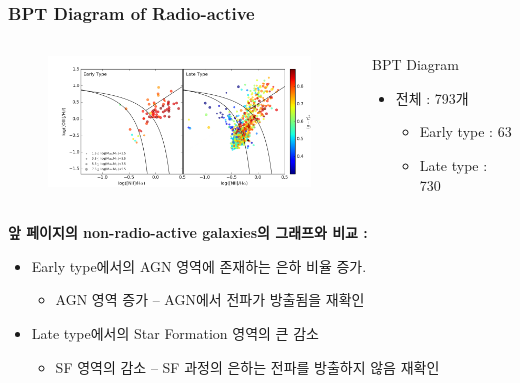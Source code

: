 \documentclass[xcolor={dvipsnames,table}]{beamer}
\newcommand\SM{\fontsize{8}{7.2}\selectfont}
\newcommand\SSM{\fontsize{7}{7.2}\selectfont}
\begin{document}
\begin{frame}
  \frametitle{BPT Diagram of Radio-active}
  \SM
  \begin{columns}
   \begin{figure}
    \centering
    \includegraphics[width=7cm, height=3.5cm]{BPT_radio_Active.png}
   \end{figure}
   \centering
   \begin{block}{BPT Diagram}
    \begin{itemize}
     \item 전체 : 793개
     \begin{itemize}
      \item Early type : 63
      \item Late type : 730
     \end{itemize}
    \end{itemize}
   \end{block}
  \end{columns}
  \vspace{0.2cm}
  \textbf{앞 페이지의 non-radio-active galaxies의 그래프와 비교 :}
  \begin{itemize}
   \item  Early type에서의 AGN 영역에 존재하는 은하 비율 증가.
   \begin{itemize}
   \SSM
   [triangle]
    \item  AGN 영역 증가 – AGN에서 전파가 방출됨을 재확인
   \end{itemize}
   \item  Late type에서의 Star Formation 영역의 큰 감소
   \begin{itemize}
   \SSM
   [triangle]
    \item  SF 영역의 감소 – SF 과정의 은하는 전파를 방출하지 않음 재확인
   \end{itemize}
  \end{itemize}
\end{frame}
\end{document}
